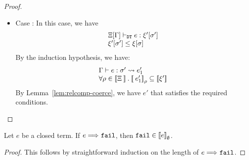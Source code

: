 \begin{proof}
\begin{itemize}
\item Case :
In this case, we have
\[
\begin{array}{l}
\Xi[\Gamma] \vdash_{\texttt{DT}} e: \xi'[\sigma']\\
\xi'[\sigma']\leq \xi[\sigma]
\end{array}
\]
By the induction hypothesis, we have:
\[
\begin{array}{l}
\Gamma \vdash e : \sigma' \leadsto e_1'\\
\forall \rho\in \mathbin{[\![}\Xi\mathbin{]\!]}.\mathbin{[\![}e_1'\mathbin{]\!]}_{\rho} \subseteq \mathbin{[\![}\xi'\mathbin{]\!]}
\end{array}
\]
By Lemma~\ref{lem:relcomp-coerce}, we have \(e'\) that satisfies the required conditions.
\end{itemize}

\end{proof}

\begin{lemma}
\label{lem:denot}
Let \(e\) be a closed term.
If \(e\stackrel{}{\Longrightarrow}_{}{} \mathtt{fail}\), then \(\mathtt{fail} \in \mathbin{[\![}e\mathbin{]\!]}_{\emptyset}\).
\end{lemma}
\begin{proof}
This follows by straightforward induction on the length of \(e\stackrel{}{\Longrightarrow}_{}{}\mathtt{fail}\).
\end{proof}

